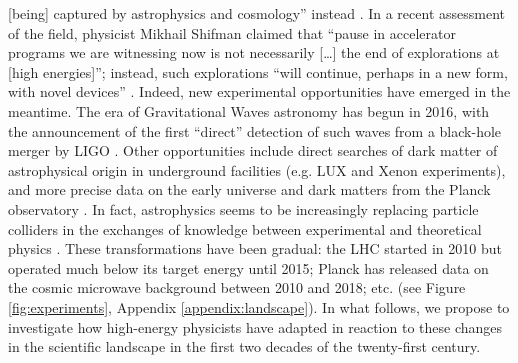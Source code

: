 \documentclass{article}
\begin{document}
[being] captured by astrophysics and cosmology'' instead \citep{Kosyakov2023}. In a recent assessment of the field, physicist Mikhail Shifman claimed that ``pause in accelerator programs we are witnessing now is not necessarily [\dots] the end of explorations at [high energies]''; instead, such explorations ``will continue, perhaps in a new form, with novel devices'' \citep{Shifman2020}. Indeed, new experimental opportunities have emerged in the meantime. The era of Gravitational Waves astronomy has begun in 2016, with the announcement of the first ``direct'' detection of such waves from a black-hole merger by LIGO \citep{Abbott2016}. Other opportunities include direct searches of dark matter of astrophysical origin in underground facilities (e.g. LUX and Xenon experiments), and more precise data on the early universe and dark matters from the Planck observatory \citep{planck2011planck}. %
In fact, astrophysics seems to be increasingly replacing particle colliders in the exchanges of knowledge between experimental and theoretical physics \citep{Gautheron2023}. These transformations have been gradual: the LHC started in 2010 but operated much below its target energy until 2015; Planck has released data on the cosmic microwave background between 2010 and 2018; etc. (see Figure \ref{fig:experiments}, Appendix \ref{appendix:landscape}). In what follows, we propose to investigate how high-energy physicists have adapted in reaction to these changes in the scientific landscape in the first two decades of the twenty-first century.%
\end{document}
